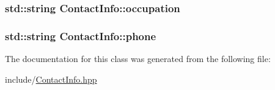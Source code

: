 \subsubsection[{\texorpdfstring{occupation}{occupation}}]{\setlength{\rightskip}{0pt plus 5cm}std\+::string Contact\+Info\+::occupation\hspace{0.3cm}{\ttfamily [private]}}\hypertarget{classContactInfo_a7126750ab0c8294f092278639d51c68a}{}\label{classContactInfo_a7126750ab0c8294f092278639d51c68a}
\subsubsection[{\texorpdfstring{phone}{phone}}]{\setlength{\rightskip}{0pt plus 5cm}std\+::string Contact\+Info\+::phone\hspace{0.3cm}{\ttfamily [private]}}\hypertarget{classContactInfo_a74d162bbb4a96dff6794e644e6d62e38}{}\label{classContactInfo_a74d162bbb4a96dff6794e644e6d62e38}


The documentation for this class was generated from the following file\+:\begin{DoxyCompactItemize}
\item 
include/\hyperlink{ContactInfo_8hpp}{Contact\+Info.\+hpp}\end{DoxyCompactItemize}
